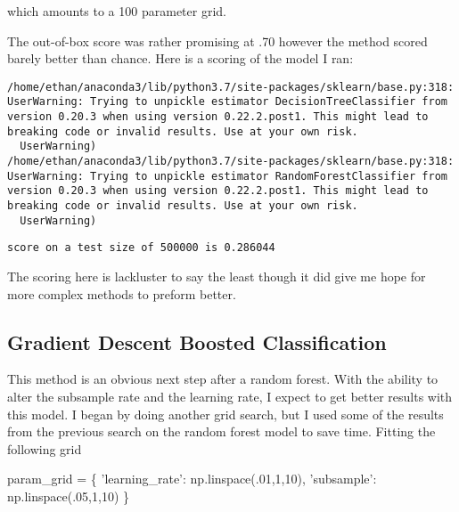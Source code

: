 \documentclass[11pt]{article}
\newenvironment{Shaded}{}{}
\newcommand{\DecValTok}[1]{\textcolor[rgb]{0.25,0.63,0.44}{{#1}}}
\newcommand{\StringTok}[1]{\textcolor[rgb]{0.25,0.44,0.63}{{#1}}}
\newcommand{\NormalTok}[1]{{#1}}
\newcommand{\OperatorTok}[1]{\textcolor[rgb]{0.40,0.40,0.40}{{#1}}}
\begin{document}
which amounts to a 100 parameter grid.

The out-of-box score was rather promising at .70 however the method
scored barely better than chance. Here is a scoring of the model I ran:

    \begin{Verbatim}[commandchars=\\\{\}]
/home/ethan/anaconda3/lib/python3.7/site-packages/sklearn/base.py:318: UserWarning: Trying to unpickle estimator DecisionTreeClassifier from version 0.20.3 when using version 0.22.2.post1. This might lead to breaking code or invalid results. Use at your own risk.
  UserWarning)
/home/ethan/anaconda3/lib/python3.7/site-packages/sklearn/base.py:318: UserWarning: Trying to unpickle estimator RandomForestClassifier from version 0.20.3 when using version 0.22.2.post1. This might lead to breaking code or invalid results. Use at your own risk.
  UserWarning)

    \end{Verbatim}

    \begin{Verbatim}[commandchars=\\\{\}]
score on a test size of 500000 is 0.286044

    \end{Verbatim}

    The scoring here is lackluster to say the least though it did give me
hope for more complex methods to preform better.

\hypertarget{gradient-descent-boosted-classification}{%
\subsection{Gradient Descent Boosted
Classification}\label{gradient-descent-boosted-classification}}

This method is an obvious next step after a random forest. With the
ability to alter the subsample rate and the learning rate, I expect to
get better results with this model. I began by doing another grid
search, but I used some of the results from the previous search on the
random forest model to save time. Fitting the following grid

\begin{Shaded}
\begin{Highlighting}[]
\NormalTok{param_grid }\OperatorTok{=}\NormalTok{ \{}
    \StringTok{'learning_rate'}\NormalTok{: np.linspace(.}\DecValTok{01}\NormalTok{,}\DecValTok{1}\NormalTok{,}\DecValTok{10}\NormalTok{),}
    \StringTok{'subsample'}\NormalTok{: np.linspace(.}\DecValTok{05}\NormalTok{,}\DecValTok{1}\NormalTok{,}\DecValTok{10}\NormalTok{)}
\NormalTok{\}}
\end{Highlighting}
\end{Shaded}
\end{document}
